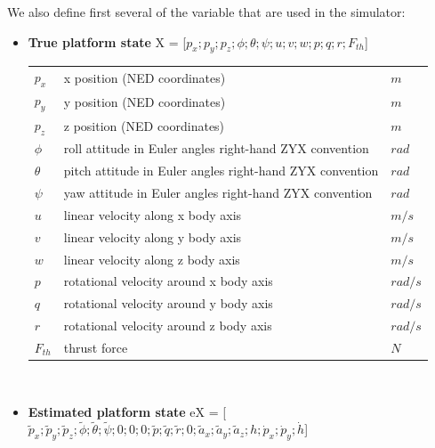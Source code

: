 \documentclass[a4paper,11pt]{report}
\begin{document}
We also define first several of the variable that are used in the simulator:
\begin{itemize}

\item \textbf{True platform state} X = [$p_x;p_y;p_z;\phi;\theta;\psi;u;v;w;p;q;r;F_{th}$]

\begin{tabular}{lll}
    $p_x$ & x position (NED coordinates)                            & $m$\\
    $p_y$ & y position (NED coordinates)                            & $m$\\
    $p_z$ & z position (NED coordinates)                            & $m$\\
   $\phi$ & roll attitude in Euler angles right-hand ZYX convention & $rad$\\
 $\theta$ & pitch attitude in Euler angles right-hand ZYX convention & $rad$\\
   $\psi$ & yaw attitude in Euler angles right-hand ZYX convention  & $rad$\\
     $u$  & linear velocity along x body axis                      & $m/s$\\
     $v$  & linear velocity along y body axis                      & $m/s$\\
     $w$  & linear velocity along z body axis                      & $m/s$\\
     $p$  & rotational velocity around x body axis                  & $rad/s$\\ 
     $q$  & rotational velocity around y body axis                  & $rad/s$\\ 
     $r$  & rotational velocity around z body axis                  & $rad/s$\\ 
 $F_{th}$ & thrust force                                            & $N$
\end{tabular} 
\\

\item  \textbf{Estimated platform state} eX = [$\tilde{p}_x;\tilde{p}_y;\tilde{p}_z;\tilde{\phi};\tilde{\theta};\tilde{\psi};0;0;0;\tilde{p};\tilde{q};\tilde{r};0;\tilde{a}_x;\tilde{a}_y;\tilde{a}_z;h;\dot{p}_x;\dot{p}_y;\dot{h}$]


\end{itemize}
\end{document}
